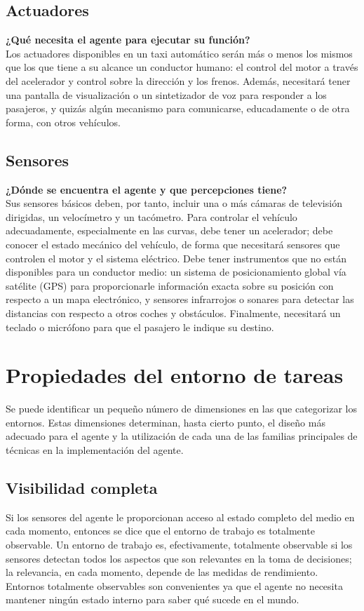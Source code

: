 \documentclass[12pt,a4paper]{report}
\begin{document}
\subsection*{Actuadores}
\textbf{¿Qué necesita el agente para ejecutar su función?}\\Los actuadores disponibles en un taxi automático serán más o menos los mismos que los que tiene a su alcance un conductor humano: el control del motor a través del acelerador y control sobre la dirección y los frenos. Además, necesitará tener una pantalla de visualización o un sintetizador de voz para responder a los pasajeros, y quizás algún mecanismo para comunicarse, educadamente o de otra forma, con otros vehículos.
\subsection*{Sensores}
\textbf{¿Dónde se encuentra el agente y que percepciones tiene?}\\Sus sensores básicos deben, por tanto, incluir una o más cámaras de televisión dirigidas, un velocímetro y un tacómetro. Para controlar el vehículo adecuadamente, especialmente en las curvas, debe tener un acelerador; debe conocer el estado mecánico del vehículo, de forma que necesitará sensores que controlen el motor y el sistema eléctrico. Debe tener instrumentos que no están disponibles para un conductor medio: un sistema de posicionamiento global vía satélite (GPS) para proporcionarle información exacta sobre su posición con respecto a un mapa electrónico, y sensores infrarrojos o sonares para detectar las distancias con respecto a otros coches y obstáculos. Finalmente, necesitará un teclado o micrófono para que el pasajero le indique su destino.
\section{Propiedades del entorno de tareas} 
Se puede identificar un pequeño número de dimensiones en las que categorizar los entornos. Estas dimensiones determinan, hasta cierto punto, el diseño más adecuado para el agente y la utilización de cada una de las familias principales de técnicas en la implementación del agente.
\subsection*{Visibilidad completa}
Si los sensores del agente le proporcionan acceso al estado completo del medio en cada momento, entonces se dice que el entorno de trabajo es totalmente observable. Un entorno de trabajo es, efectivamente, totalmente observable si los sensores detectan todos los aspectos que son relevantes en la toma de decisiones; la relevancia, en cada momento, depende de las medidas de rendimiento. Entornos totalmente observables son convenientes ya que el agente no necesita mantener ningún estado interno para saber qué sucede en el mundo.
\end{document}
